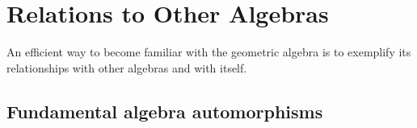 








\section{Relations to Other Algebras}

An efficient way to become familiar with the geometric algebra is to exemplify its relationships with other algebras and with itself.

\subsection{Fundamental algebra automorphisms}


